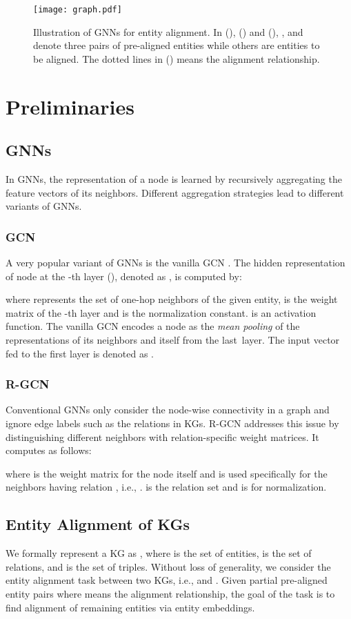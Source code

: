 \documentclass[letterpaper]{article} \usepackage{aaai20}  \usepackage{times}  \usepackage{helvet} \usepackage{courier}  \usepackage[hyphens]{url}  \usepackage{graphicx} \urlstyle{rm} \def\UrlFont{\rm}  \frenchspacing  \setlength{\pdfpagewidth}{8.5in}  \setlength{\pdfpageheight}{11in}  \usepackage{amsmath}
\begin{document}
\begin{figure*}[!t]
	\center
	\texttt{[image: graph.pdf]}
	\caption{Illustration of GNNs for entity alignment. In (), () and (), ,  and  denote three pairs of pre-aligned entities while others are entities to be aligned. The dotted lines in () means the alignment relationship.}
	\label{fig:graph}
\end{figure*}

\section{Preliminaries}
\label{sect:preli}
\subsection{GNNs}
In GNNs, the representation of a node is learned by recursively aggregating the feature vectors of its neighbors. Different aggregation strategies lead to different variants of GNNs. 
\subsubsection{GCN} A very popular variant of GNNs is the vanilla GCN \cite{GCN}. The hidden representation of node  at the -th layer (), denoted as , is computed by: 

where  represents the set of one-hop neighbors of the given entity,  is the weight matrix of the -th layer and  is the normalization constant.  is an activation function. The vanilla GCN encodes a node as the \textit{mean pooling} of the representations of its neighbors and itself from the last~layer. The input vector fed to the first layer is denoted as .

\subsubsection{R-GCN} Conventional GNNs only consider the node-wise connectivity in a graph and ignore edge labels such as the relations in KGs. R-GCN \cite{R-GCN} addresses this issue by distinguishing different neighbors with relation-specific weight matrices. It computes  as follows: 

where  is the weight matrix for the node itself and  is used specifically for the neighbors having relation , i.e., .  is the relation set and  is for normalization. 

\subsection{Entity Alignment of KGs}
We formally represent a KG as , where  is the set of entities,  is the set of relations, and  is the set of triples. Without loss of generality, we consider the entity alignment task between two KGs, i.e.,  and . Given partial pre-aligned entity pairs  where  means the alignment relationship, the goal of the task is to find alignment of remaining entities via entity embeddings. 
\end{document}
